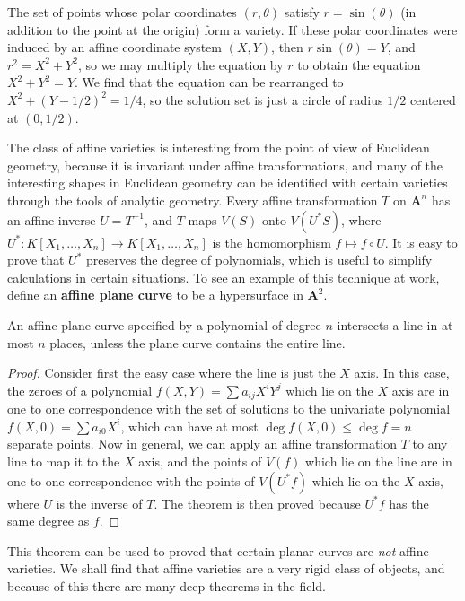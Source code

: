 \begin{example}
    The set of points whose polar coordinates $(r,\theta)$ satisfy $r = \sin(\theta)$ (in addition to the point at the origin) form a variety. If these polar coordinates were induced by an affine coordinate system $(X,Y)$, then $r \sin(\theta) = Y$, and $r^2 = X^2 + Y^2$, so we may multiply the equation by $r$ to obtain the equation $X^2 + Y^2 = Y$. We find that the equation can be rearranged to $X^2 + (Y-1/2)^2 = 1/4$, so the solution set is just a circle of radius $1/2$ centered at $(0,1/2)$.
\end{example}

The class of affine varieties is interesting from the point of view of Euclidean geometry, because it is invariant under affine transformations, and many of the interesting shapes in Euclidean geometry can be identified with certain varieties through the tools of analytic geometry. Every affine transformation $T$ on $\mathbf{A}^n$ has an affine inverse $U = T^{-1}$, and $T$ maps $V(S)$ onto $V(U^*S)$, where $U^*: K[X_1, \dots, X_n] \to K[X_1, \dots, X_n]$ is the homomorphism $f \mapsto f \circ U$. It is easy to prove that $U^*$ preserves the degree of polynomials, which is useful to simplify calculations in certain situations. To see an example of this technique at work, define an {\bf affine plane curve} to be a hypersurface in $\mathbf{A}^2$.

\begin{theorem}
    An affine plane curve specified by a polynomial of degree $n$ intersects a line in at most $n$ places, unless the plane curve contains the entire line.
\end{theorem}
\begin{proof}
    Consider first the easy case where the line is just the $X$ axis. In this case, the zeroes of a polynomial $f(X,Y) = \sum a_{ij} X^iY^j$ which lie on the $X$ axis are in one to one correspondence with the set of solutions to the univariate polynomial $f(X,0) = \sum a_{i0} X^i$, which can have at most $\deg f(X,0) \leq \deg f = n$ separate points. Now in general, we can apply an affine transformation $T$ to any line to map it to the $X$ axis, and the points of $V(f)$ which lie on the line are in one to one correspondence with the points of $V(U^*f)$ which lie on the $X$ axis, where $U$ is the inverse of $T$. The theorem is then proved because $U^* f$ has the same degree as $f$.
\end{proof}

This theorem can be used to proved that certain planar curves are {\it not} affine varieties. We shall find that affine varieties are a very rigid class of objects, and because of this there are many deep theorems in the field.

